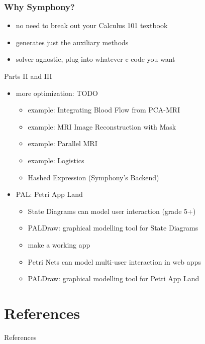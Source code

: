\documentclass[presentation]{beamer}
\begin{document}
\begin{frame}[fragile]
  \frametitle{Why Symphony?}
  \begin{itemize}
  \item no need to break out your Calculus 101 textbook
  \item generates just the auxiliary methods
  \item solver agnostic, plug into whatever c code you want
  \end{itemize}
\end{frame}

\begin{frame}{Parts II and III}
  \begin{itemize}
  \item more optimization: TODO
  \begin{itemize}
  \item example: Integrating Blood Flow from PCA-MRI
  \item example: MRI Image Reconstruction with Mask
  \item example: Parallel MRI
  \item example: Logistics
  \item Hashed Expression (Symphony's Backend)
  \end{itemize}
  \item PAL:  Petri App Land
  \begin{itemize}
  \item State Diagrams can model user interaction (grade 5+)
  \item PALDraw:  graphical modelling tool for State Diagrams
  \item make a working app
  \item Petri Nets can model multi-user interaction in web apps
  \item PALDraw:  graphical modelling tool for Petri App Land
  \end{itemize}
  \end{itemize}
\end{frame}

\section{References}
\label{sec:org51a8b04}
\begin{frame}[label={sec:org2b02857}]{References}
\printbibliography[heading=none]
\end{frame}
\end{document}
